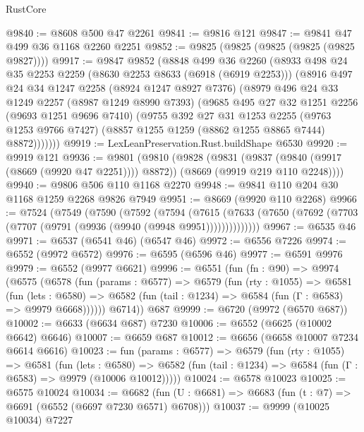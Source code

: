 \begin{lexlean}{RustCore}
\begin{coremodule}
@9840 := @8608 @500 @47 @2261
@9841 := @9816 @121
@9847 := @9841 @47 @499 @36 @1168 @2260 @2251
@9852 := @9825 (@9825 (@9825 (@9825 (@9825 @9827))))
@9917 := @9847
    @9852
    (@8848
      @499
      @36
      @2260
      (@8933
        @498
        @24
        @35
        @2253
        @2259
        (@8630 @2253 @8633 (@6918 (@6919 @2253)))
        (@8916
          @497
          @24
          @34
          @1247
          @2258
          (@8924 @1247 @8927 @7376)
          (@8979
            @496
            @24
            @33
            @1249
            @2257
            (@8987 @1249 @8990 @7393)
            (@9685
              @495
              @27
              @32
              @1251
              @2256
              (@9693 @1251 @9696 @7410)
              (@9755
                @392
                @27
                @31
                @1253
                @2255
                (@9763 @1253 @9766 @7427)
                (@8857 @1255 @1259 (@8862 @1255 @8865 @7444) @8872)))))))
@9919 := LexLeanPreservation.Rust.buildShape @6530
@9920 := @9919 @121
@9936 := @9801
    (@9810
      (@9828
        (@9831 (@9837 (@9840 (@9917 (@8669 (@9920 @47 @2251)))) @8872))
        (@8669 (@9919 @219 @110 @2248))))
@9940 := @9806 @506 @110 @1168 @2270
@9948 := @9841 @110 @204 @30 @1168 @1259 @2268 @9826 @7949
@9951 := @8669 (@9920 @110 @2268)
@9966 := @7524
    (@7549
      (@7590
        (@7592
          (@7594
            (@7615
              (@7633 (@7650 (@7692 (@7703 (@7707 (@9791 (@9936 (@9940 (@9948 @9951))))))))))))))
@9967 := @6535 @46
@9971 := @6537 (@6541 @46) (@6547 @46)
@9972 := @6556 @7226
@9974 := @6552 (@9972 @6572)
@9976 := @6595 (@6596 @46)
@9977 := @6591 @9976
@9979 := @6552 (@9977 @6621)
@9996 := @6551
    (fun (fn : @90) =>
    @9974
      (@6575
        (@6578
          (fun (params : @6577) =>
          @6579
            (fun (rty : @1055) =>
            @6581
              (fun (lets : @6580) =>
              @6582 (fun (tail : @1234) => @6584 (fun (Γ : @6583) => @9979 @6668))))))
        @6714))
    @687
@9999 := @6720 (@9972 (@6570 @687))
@10002 := @6633 (@6634 @687) @7230
@10006 := @6552 (@6625 (@10002 @6642) @6646)
@10007 := @6659 @687
@10012 := @6656 (@6658 @10007 @7234 @6614 @6616)
@10023 := fun (params : @6577) =>
  @6579
    (fun (rty : @1055) =>
    @6581
      (fun (lets : @6580) =>
      @6582 (fun (tail : @1234) => @6584 (fun (Γ : @6583) => @9979 (@10006 @10012)))))
@10024 := @6578 @10023
@10025 := @6575 @10024
@10034 := @6682 (fun (U : @6681) => @6683 (fun (t : @7) => @6691 (@6552 (@6697 @7230 @6571) @6708)))
@10037 := @9999 (@10025 @10034) @7227

\end{coremodule}
\end{lexlean}
